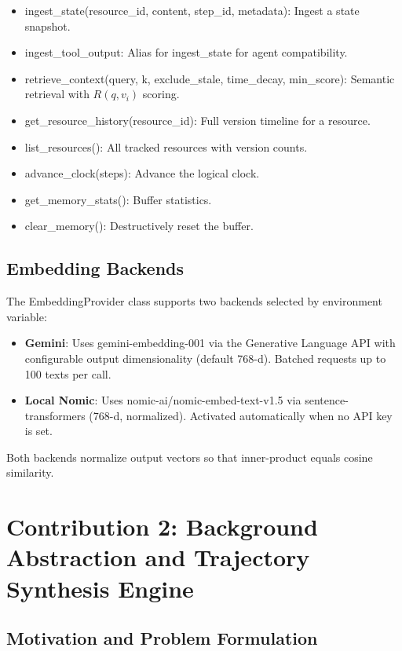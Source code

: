 \documentclass[lettersize,journal]{IEEEtran}
\begin{document}
\begin{itemize}
    \item ingest\_state(resource\_id, content, step\_id, metadata): Ingest a state snapshot.
    \item ingest\_tool\_output: Alias for ingest\_state for agent compatibility.
    \item retrieve\_context(query, k, exclude\_stale, time\_decay, min\_score): Semantic retrieval with $R(q, v_i)$ scoring.
    \item get\_resource\_history(resource\_id): Full version timeline for a resource.
    \item list\_resources(): All tracked resources with version counts.
    \item advance\_clock(steps): Advance the logical clock.
    \item get\_memory\_stats(): Buffer statistics.
    \item clear\_memory(): Destructively reset the buffer.
\end{itemize}

\subsection{Embedding Backends}

The EmbeddingProvider class supports two backends selected by environment variable:

\begin{itemize}
    \item \textbf{Gemini}: Uses gemini-embedding-001 via the Generative Language API with configurable output dimensionality (default 768-d). Batched requests up to 100 texts per call.
    \item \textbf{Local Nomic}: Uses nomic-ai/nomic-embed-text-v1.5 via sentence-transformers (768-d, normalized). Activated automatically when no API key is set.
\end{itemize}

Both backends normalize output vectors so that inner-product equals cosine similarity.

\section{Contribution 2: Background Abstraction and Trajectory Synthesis Engine}

\subsection{Motivation and Problem Formulation}
\end{document}
